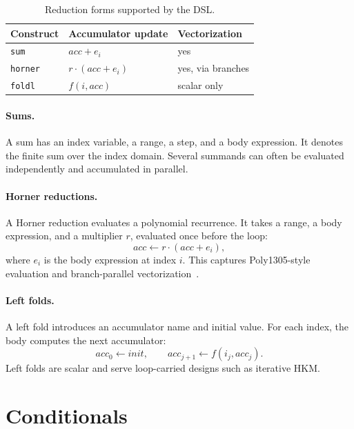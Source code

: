 \begin{table}[t]
    \centering
    \small
    \setlength{\tabcolsep}{3pt}
    \caption{Reduction forms supported by the DSL.}
    \label{tab:reduction-forms}
    \begin{tabular}{p{}p{}p{}}
        \toprule
        Construct & Accumulator update & Vectorization \\
        \midrule
        \texttt{sum} &
        \(acc + e_i\) &
        yes \\
        \texttt{horner} &
        \(r \cdot (acc + e_i)\) &
        yes, via branches \\
        \texttt{foldl} &
        \(f(i, acc)\) &
        scalar only \\
        \bottomrule
    \end{tabular}
\end{table}

\paragraph{Sums.}
A sum has an index variable, a range, a step, and a body expression. It denotes the finite sum over the index domain. Several summands can often be evaluated independently and accumulated in parallel.

\paragraph{Horner reductions.}
A Horner reduction evaluates a polynomial recurrence. It takes a range, a body expression, and a multiplier \(r\), evaluated once before the loop:
\[
    acc \leftarrow r \cdot (acc + e_i),
\]
where \(e_i\) is the body expression at index \(i\). This captures Poly1305-style evaluation and branch-parallel vectorization~\cite{bernstein2007pema,degabriele2024sok}.

\paragraph{Left folds.}
A left fold introduces an accumulator name and initial value. For each index, the body computes the next accumulator:
\[
    acc_0 \leftarrow init,\qquad acc_{j+1} \leftarrow f(i_j, acc_j).
\]
Left folds are scalar and serve loop-carried designs such as iterative HKM.

\section{Conditionals}
\label{sec:dsl-conditionals}

